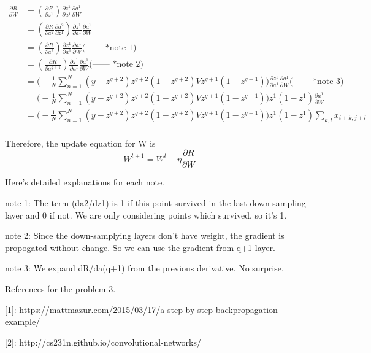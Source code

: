 \documentclass[11pt]{article}
\theoremstyle{definition}
\begin{document}
\begin{enumerate}
\begin{equation*}
\begin{split}
\frac{\partial R}{\partial W} & = (\frac{\partial R}{\partial z^1})
				\frac{\partial z^1} {\partial a^1}
				\frac{\partial a^1} {\partial W} \\
				& = (\frac{\partial R}{\partial a^{2}}
				\frac{\partial a^{2}} {\partial z^{1}})
				\frac{\partial z^1} {\partial a^1}
				\frac{\partial a^1} {\partial W} \\
				& = (\frac{\partial R}{\partial a^{2}})
				\frac{\partial z^1} {\partial a^1}
				\frac{\partial a^1} {\partial W} \text{(------ *note 1)}\\
				& = (\frac{\partial R}{\partial a^{q+1}})
				\frac{\partial z^1} {\partial a^1}
				\frac{\partial a^1} {\partial W} \text{(------ *note 2)}\\
				& = \bigg( - \frac{1}{N} \sum_{n=1}^{N} (y - z^{q+2})
					z^{q+2}(1-z^{q+2})
					V
					z^{q+1}(1-z^{q+1}) \bigg)
				\frac{\partial z^1} {\partial a^1}
				\frac{\partial a^1} {\partial W} \text{(------ *note 3)}\\
				& = \bigg( - \frac{1}{N} \sum_{n=1}^{N} (y - z^{q+2})
					z^{q+2}(1-z^{q+2})
					V
					z^{q+1}(1-z^{q+1}) \bigg)
				z^1 (1-z^1)
				\frac{\partial a^1} {\partial W} \\
				& = \bigg( - \frac{1}{N} \sum_{n=1}^{N} (y - z^{q+2})
					z^{q+2}(1-z^{q+2})
					V
					z^{q+1}(1-z^{q+1}) \bigg)
				z^1 (1-z^1)
				\sum_{k,l} x_{i+k,j+l} \\
\end{split}
\end{equation*}

Therefore, the update equation for W is
\begin{equation*}
W^{t+1} = W^t - \eta \frac{\partial R}{\partial W}
\end{equation*}

Here's detailed explanations for each note.

note 1: The term (da2/dz1) is 1 if this point survived in the last down-sampling layer and 0 if not. We are only considering points which survived, so it's 1.

note 2: Since the down-samplying layers don't have weight, the gradient is
propogated without change. So we can use the gradient from q+1
layer. 

note 3: We expand dR/da(q+1) from the previous derivative. No surprise.

\end{enumerate}


\bigskip
References for the problem 3.

[1]: https://mattmazur.com/2015/03/17/a-step-by-step-backpropagation-example/

[2]: http://cs231n.github.io/convolutional-networks/
\end{document}

